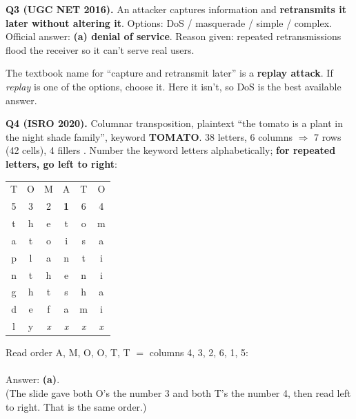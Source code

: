 \textbf{Q3 (UGC NET 2016).} An attacker captures information and \textbf{retransmits it later without altering it}. Options: DoS / masquerade / simple / complex. Official answer: \textbf{(a) denial of service}. Reason given: repeated retransmissions flood the receiver so it can't serve real users.
\begin{keybox}[title=Exam note]
The textbook name for ``capture and retransmit later'' is a \textbf{replay attack}. If \emph{replay} is one of the options, choose it. Here it isn't, so DoS is the best available answer.
\end{keybox}

\textbf{Q4 (ISRO 2020).} Columnar transposition, plaintext ``the tomato is a plant in the night shade family'', keyword \textbf{TOMATO}.
38 letters, 6 columns $\Rightarrow$ 7 rows (42 cells), 4 fillers . Number the keyword letters alphabetically; \textbf{for repeated letters, go left to right}:
\begin{center}\small
\begin{minipage}[c]{0.4\textwidth}\centering
\begin{tabular}{|*{6}{c|}}
\multicolumn{1}{c}{T}&\multicolumn{1}{c}{O}&\multicolumn{1}{c}{M}&\multicolumn{1}{c}{A}&\multicolumn{1}{c}{T}&\multicolumn{1}{c}{O}\\
\multicolumn{1}{c}{5}&\multicolumn{1}{c}{3}&\multicolumn{1}{c}{2}&\multicolumn{1}{c}{\textbf{1}}&\multicolumn{1}{c}{6}&\multicolumn{1}{c}{4}\\
\hline
t&h&e&\cellcolor{warn!18}t&o&m\\\hline
a&t&o&\cellcolor{warn!18}i&s&a\\\hline
p&l&a&\cellcolor{warn!18}n&t&i\\\hline
n&t&h&\cellcolor{warn!18}e&n&i\\\hline
g&h&t&\cellcolor{warn!18}s&h&a\\\hline
d&e&f&\cellcolor{warn!18}a&m&i\\\hline
l&y&\textit{x}&\cellcolor{warn!18}\textit{x}&\textit{x}&\textit{x}\\\hline
\end{tabular}
\end{minipage}
\begin{minipage}[c]{0.5\textwidth}
Read order A, M, O, O, T, T $=$ columns 4, 3, 2, 6, 1, 5:\\[3pt]
\\[3pt]
Answer: \textbf{(a)}.\\[2pt]
{\footnotesize (The slide gave both O's the number 3 and both T's the number 4, then read left to right. That is the same order.)}
\end{minipage}
\end{center}

